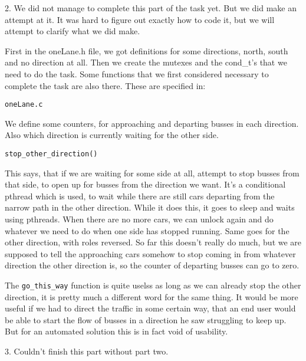 2. We did not manage to complete this part of the task yet. But we did
make an attempt at it. It was hard to figure out exactly how to code
it, but we will attempt to clarify what we did make.

First in the oneLane.h file, we got definitions for some directions,
north, south and no direction at all. Then we create the mutexes and
the cond\_t's that we need to do the task. Some functions that we
first considered necessary to complete the task are also there. These
are specified in:

\vspace{0.5pc}

\verb+oneLane.c+

We define some counters, for approaching and departing busses in each
direction. Also which direction is currently waiting for the other
side.

\vspace{0.5pc}

\verb+stop_other_direction()+

This says, that if we are waiting for some side at all, attempt to
stop busses from that side, to open up for busses from the direction
we want. It's a conditional pthread which is used, to wait while there
are still cars departing from the narrow path in the other
direction. While it does this, it goes to sleep and waits using
pthreads. When there are no more cars, we can unlock again and do
whatever we need to do when one side has stopped running. Same goes
for the other direction, with roles reversed. So far this doesn't
really do much, but we are supposed to tell the approaching cars
somehow to stop coming in from whatever direction the other direction
is, so the counter of departing busses can go to zero.

The \verb+go_this_way+ function is quite uselss as long as we can
already stop the other direction, it is pretty much a different word
for the same thing. It would be more useful if we had to direct the
traffic in some certain way, that an end user would be able to start
the flow of busses in a direction he saw struggling to keep up. But
for an automated solution this is in fact void of usability.

3. Couldn't finish this part without part two.




%



